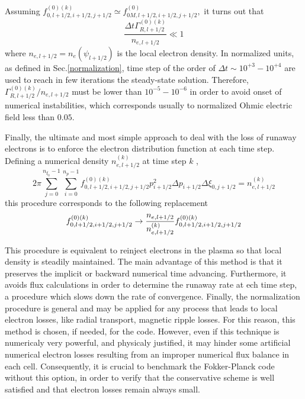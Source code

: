 Assuming $f_{0,l+1/2,i+1/2,j+1/2}^{\left( 0\right) (k)}\simeq
f_{0M,l+1/2,i+1/2,j+1/2}^{\left( 0\right) },$ it turns out that
\begin{equation}
\frac{\Delta t\Gamma _{R,l+1/2}^{\left( 0\right) (k)}}{n_{e,l+1/2}}\ll 1
\end{equation}
where $n_{e,l+1/2}=n_{e}\left( \psi _{l+1/2}\right) $ is the local electron
density. In normalized units, as defined in Sec.\ref{normalization}, time
step of the order of $\Delta t\sim 10^{+3}-10^{+4}$ are used to reach in few
iterations the steady-state solution. Therefore, $\Gamma _{R,l+1/2}^{\left(
0\right) (k)}/n_{e,l+1/2}$ must be lower than $10^{-5}-10^{-6}$ in order to
avoid onset of numerical instabilities, which corresponds usually to
normalized Ohmic electric field less than $0.05$.

Finally, the ultimate and most simple approach to deal with the loss of
runaway electrons is to enforce the electron distribution function at each
time step. Defining a numerical density $n_{e,l+1/2}^{(k)}$ at time step $k$
,
\begin{equation}
2\pi \sum_{j=0}^{n_{\xi
_{0}}-1}\sum_{i=0}^{n_{p}-1}f_{0,l+1/2,i+1/2,j+1/2}^{\left( 0\right)
(k)}p_{i+1/2}^{2}\Delta p_{i+1/2}\Delta \xi _{0,j+1/2}=n_{e,l+1/2}^{(k)}
\end{equation}
this procedure corresponds to the following replacement
\begin{equation}
f_{0,l+1/2,i+1/2,j+1/2}^{\left( 0\right) (k)}\rightarrow \frac{n_{e,l+1/2}}{%
n_{e,l+1/2}^{(k)}}f_{0,l+1/2,i+1/2,j+1/2}^{\left( 0\right) (k)}
\end{equation}

This procedure is equivalent to reinject electrons in the plasma so that
local density is steadily maintained. The main advantage of this method is
that it preserves the implicit or backward numerical time advancing.
Furthermore, it avoids flux calculations in order to determine the runaway
rate at ech time step, a procedure which slows down the rate of convergence.
Finally, the normalization procedure is general and may be applied for any
process that leads to local electron losses, like radial transport, magnetic
ripple losses. For this reason, this method is chosen, if needed, for the
code. However, even if this technique is numericaly very powerful, and
physicaly justified, it may hinder some artificial numerical electron losses
resulting from an improper numerical flux balance in each cell.
Consequently, it is crucial to benchmark the Fokker-Planck code without this
option, in order to verify that the conservative scheme is well satisfied
and that electron losses remain always small.

